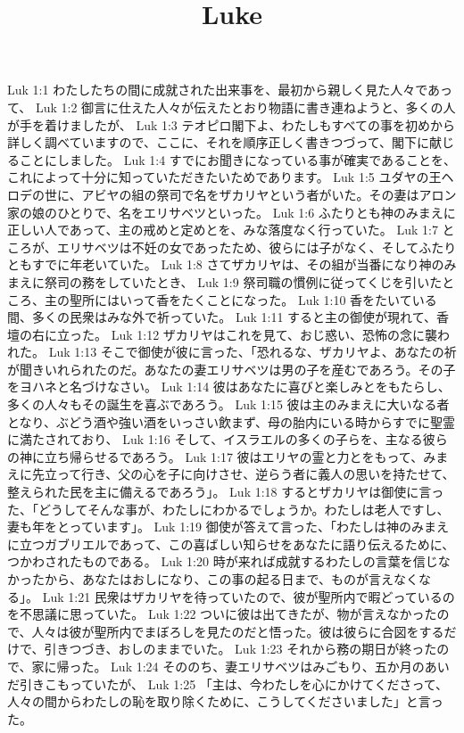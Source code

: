 

\title{Luke}

Luk 1:1  わたしたちの間に成就された出来事を、最初から親しく見た人々であって、
Luk 1:2  御言に仕えた人々が伝えたとおり物語に書き連ねようと、多くの人が手を着けましたが、
Luk 1:3  テオピロ閣下よ、わたしもすべての事を初めから詳しく調べていますので、ここに、それを順序正しく書きつづって、閣下に献じることにしました。
Luk 1:4  すでにお聞きになっている事が確実であることを、これによって十分に知っていただきたいためであります。
Luk 1:5  ユダヤの王ヘロデの世に、アビヤの組の祭司で名をザカリヤという者がいた。その妻はアロン家の娘のひとりで、名をエリサベツといった。
Luk 1:6  ふたりとも神のみまえに正しい人であって、主の戒めと定めとを、みな落度なく行っていた。
Luk 1:7  ところが、エリサベツは不妊の女であったため、彼らには子がなく、そしてふたりともすでに年老いていた。
Luk 1:8  さてザカリヤは、その組が当番になり神のみまえに祭司の務をしていたとき、
Luk 1:9  祭司職の慣例に従ってくじを引いたところ、主の聖所にはいって香をたくことになった。
Luk 1:10  香をたいている間、多くの民衆はみな外で祈っていた。
Luk 1:11  すると主の御使が現れて、香壇の右に立った。
Luk 1:12  ザカリヤはこれを見て、おじ惑い、恐怖の念に襲われた。
Luk 1:13  そこで御使が彼に言った、「恐れるな、ザカリヤよ、あなたの祈が聞きいれられたのだ。あなたの妻エリサベツは男の子を産むであろう。その子をヨハネと名づけなさい。
Luk 1:14  彼はあなたに喜びと楽しみとをもたらし、多くの人々もその誕生を喜ぶであろう。
Luk 1:15  彼は主のみまえに大いなる者となり、ぶどう酒や強い酒をいっさい飲まず、母の胎内にいる時からすでに聖霊に満たされており、
Luk 1:16  そして、イスラエルの多くの子らを、主なる彼らの神に立ち帰らせるであろう。
Luk 1:17  彼はエリヤの霊と力とをもって、みまえに先立って行き、父の心を子に向けさせ、逆らう者に義人の思いを持たせて、整えられた民を主に備えるであろう」。
Luk 1:18  するとザカリヤは御使に言った、「どうしてそんな事が、わたしにわかるでしょうか。わたしは老人ですし、妻も年をとっています」。
Luk 1:19  御使が答えて言った、「わたしは神のみまえに立つガブリエルであって、この喜ばしい知らせをあなたに語り伝えるために、つかわされたものである。
Luk 1:20  時が来れば成就するわたしの言葉を信じなかったから、あなたはおしになり、この事の起る日まで、ものが言えなくなる」。
Luk 1:21  民衆はザカリヤを待っていたので、彼が聖所内で暇どっているのを不思議に思っていた。
Luk 1:22  ついに彼は出てきたが、物が言えなかったので、人々は彼が聖所内でまぼろしを見たのだと悟った。彼は彼らに合図をするだけで、引きつづき、おしのままでいた。
Luk 1:23  それから務の期日が終ったので、家に帰った。
Luk 1:24  そののち、妻エリサベツはみごもり、五か月のあいだ引きこもっていたが、
Luk 1:25  「主は、今わたしを心にかけてくださって、人々の間からわたしの恥を取り除くために、こうしてくださいました」と言った。
